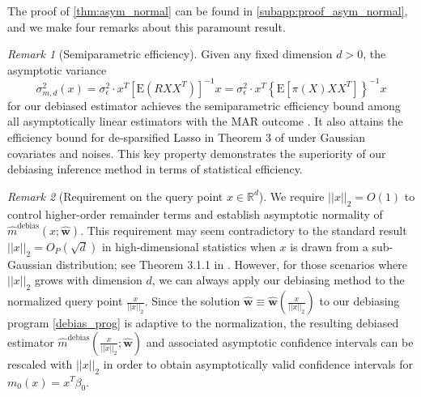 \documentclass[ejsv2,noshowframe]{imsart}
\theoremstyle{plain}
\theoremstyle{definition}
\theoremstyle{remark}
\newtheorem{remark}{Remark}
\newcommand{\norm}[1]{\left|\left| #1 \right|\right|}
\renewcommand{\hat}{\widehat}
\begin{document}
The proof of \autoref{thm:asym_normal} can be found in \autoref{subapp:proof_asym_normal}, and we make four remarks about this paramount result. 

\begin{remark}[Semiparametric efficiency]
	Given any fixed dimension $d>0$, the asymptotic variance 
	$$\sigma_{m,d}^2(x) = \sigma_{\epsilon}^2 \cdot x^T\left[\mathrm{E}\left(R XX^T\right)\right]^{-1}x = \sigma_{\epsilon}^2\cdot x^T\left\{\mathrm{E}\left[\pi(X) XX^T\right]\right\}^{-1}x$$ 
	for our debiased estimator achieves the semiparametric efficiency bound among all asymptotically linear estimators with the MAR outcome \citep{muller2012efficient}. It also attains the efficiency bound for de-sparsified Lasso in Theorem 3 of \cite{jankova2018semiparametric} under Gaussian covariates and noises. This key property demonstrates the superiority of our debiasing inference method in terms of statistical efficiency.
\end{remark}

\begin{remark}[Requirement on the query point $x \in \mathbb{R}^d$]
	We require $\norm{x}_2=O(1)$ to control higher-order remainder terms and establish asymptotic normality of $\hat{m}^{\text{debias}}(x;\hat{\bm{w}})$. This requirement may seem contradictory to the standard result $\norm{x}_2=O_P\left(\sqrt{d}\right)$ in high-dimensional statistics when $x$ is drawn from a sub-Gaussian distribution; see Theorem 3.1.1 in \cite{vershynin2018high}. However, for those scenarios where $\norm{x}_2$ grows with dimension $d$, we can always apply our debiasing method to the normalized query point $\frac{x}{\norm{x}_2}$. Since the solution $\hat{\bm{w}}\equiv \hat{\bm{w}}\left(\frac{x}{\norm{x}_2}\right)$ to our debiasing program \eqref{debias_prog} is adaptive to the normalization, the resulting debiased estimator $\hat{m}^{\text{debias}}\left(\frac{x}{\norm{x}_2};\hat{\bm{w}} \right)$ and associated asymptotic confidence intervals can be rescaled with $\norm{x}_2$ in order to obtain asymptotically valid confidence intervals for $m_0(x)=x^T\beta_0$.
\end{remark}
\end{document}
